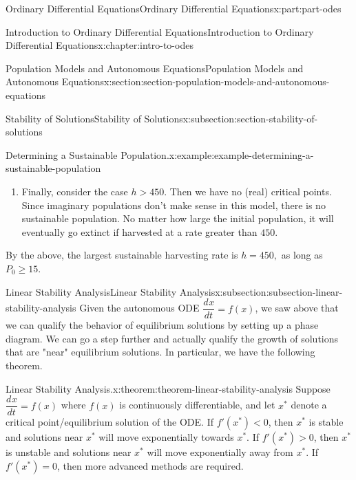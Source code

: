 \documentclass[oneside,10pt,]{book}
\newcommand{\terminology}[1]{\textbf{#1}}
\numberwithin{equation}{part}
\newcommand{\dv}[3][]{\dfrac{d^{#1} #2}{d #3^{#1}}}
\newcommand{\lt}{<}
\newcommand{\gt}{>}
\begin{document}
\begin{partptx}{Ordinary Differential Equations}{}{Ordinary Differential Equations}{}{}{x:part:part-odes}
\begin{chapterptx}{Introduction to Ordinary Differential Equations}{}{Introduction to Ordinary Differential Equations}{}{}{x:chapter:intro-to-odes}
\begin{sectionptx}{Population Models and Autonomous Equations}{}{Population Models and Autonomous Equations}{}{}{x:section:section-population-models-and-autonomous-equations}
\begin{subsectionptx}{Stability of Solutions}{}{Stability of Solutions}{}{}{x:subsection:section-stability-of-solutions}
\begin{example}{Determining a Sustainable Population.}{x:example:example-determining-a-sustainable-population}
\begin{enumerate}
\begin{figureptx}{}{g:figure:idp105548780193824}{}
\begin{image}{0.25}{0.5}{0.25}
{
}%
\end{image}%
\tcblower
\end{figureptx}%
We interpret the phase diagram as follows: if \(P\) is less than 15,000%
 then the population will collapse to extinction. Otherwise, the population will stabilize at \(15,000\). This type of critical point is often called \terminology{semi-stable.}%
\item{}Finally, consider the case \(h \gt 450\). Then we have no (real) critical points. Since imaginary populations don't make sense in this model, there is no sustainable population. No matter how large the initial population, it will eventually go extinct if harvested at a rate greater than \(450\).%
\end{enumerate}
By the above, the largest sustainable harvesting rate is \(h = 450,\) as long as \(P_{0}\geq 15\).%
\end{example}
\end{subsectionptx}
%
%
\typeout{************************************************}
\typeout{************************************************}
%
\begin{subsectionptx}{Linear Stability Analysis}{}{Linear Stability Analysis}{}{}{x:subsection:subsection-linear-stability-analysis}
Given the autonomous ODE \(\dv{x}{t} = f(x)\), we saw above that we can qualify the behavior of equilibrium solutions by setting up a phase diagram. We can go a step further and actually qualify the growth of solutions that are "near" equilibrium solutions. In particular, we have the following theorem.%
\begin{theorem}{Linear Stability Analysis.}{}{x:theorem:theorem-linear-stability-analysis}%
Suppose \(\dv{x}{t} = f(x)\) where \(f(x)\) is continuously differentiable, and let \(x^{*}\) denote a critical point\slash{}equilibrium solution of the ODE. If \(f'(x^{*}) \lt 0\), then \(x^{*}\) is stable and solutions near \(x^{*}\) will move exponentially towards \(x^{*}\). If \(f'(x^{*}) \gt 0\), then \(x^{*}\) is unstable and solutions near \(x^{*}\) will move exponentially away from \(x^{*}\). If \(f'(x^{*}) = 0\), then more advanced methods are required.%
\end{theorem}

\end{subsectionptx}
\end{sectionptx}
\end{chapterptx}
\end{partptx}
\end{document}
